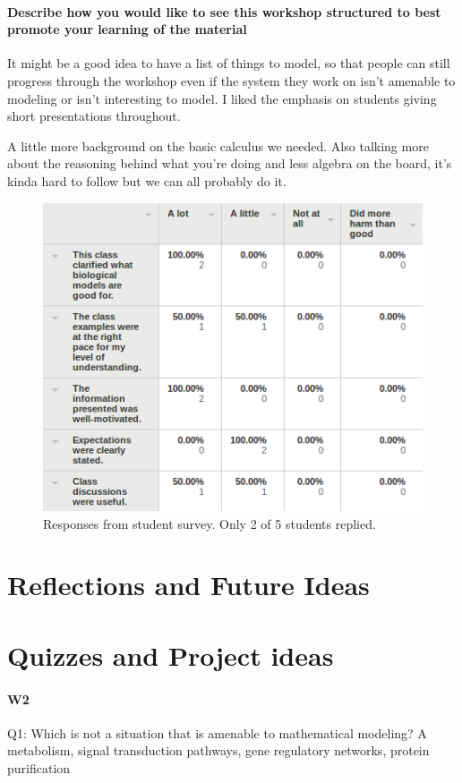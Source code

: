 \paragraph{ Describe how you would like to see this workshop structured to best promote your learning of the material }

It might be a good idea to have a list of things to model, so that people can still progress through the workshop even if the system they work on isn't amenable to modeling or isn't interesting to model. I liked the emphasis on students giving short presentations throughout. 

A little more background on the basic calculus we needed. Also talking more about the reasoning behind what you're doing and less algebra on the board, it's kinda hard to follow but we can all probably do it. 

\begin{figure}[h!]
	\centering
	\includegraphics[width=0.8\hsize]{workshop/table_of_responses.png}
	\caption{Responses from student survey.  Only 2 of 5 students replied.} 
	
\end{figure}


\section{Reflections and Future Ideas}


\section{Quizzes and Project ideas}
\paragraph{W2}
Q1: Which is not a situation that is amenable to mathematical modeling?
A metabolism, signal transduction pathways, gene regulatory networks, protein purification

